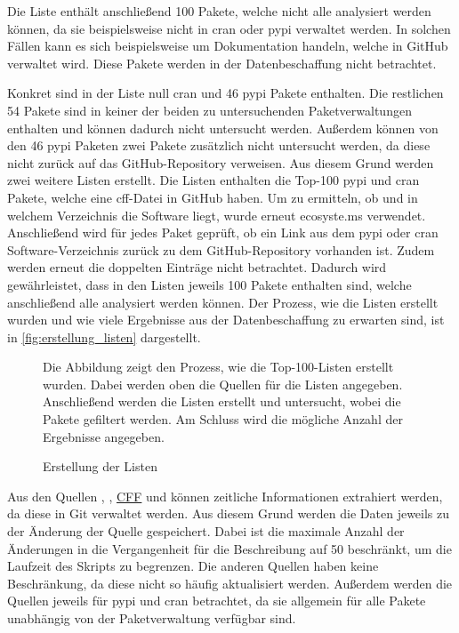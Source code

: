 Die Liste enthält anschließend 100 Pakete, welche nicht alle analysiert werden können, da sie beispielsweise nicht in \gls{cran} oder \gls{pypi} verwaltet werden.
In solchen Fällen kann es sich beispielsweise um Dokumentation handeln, welche in GitHub verwaltet wird.
Diese Pakete werden in der Datenbeschaffung nicht betrachtet.

Konkret sind in der Liste null \gls{cran} und 46 \gls{pypi} Pakete enthalten.
Die restlichen 54 Pakete sind in keiner der beiden zu untersuchenden Paketverwaltungen enthalten und können dadurch nicht untersucht werden.
Außerdem können von den 46 \gls{pypi} Paketen zwei Pakete zusätzlich nicht untersucht werden, da diese nicht zurück auf das GitHub-Repository verweisen.
Aus diesem Grund werden zwei weitere Listen erstellt.
Die Listen enthalten die Top-100 \gls{pypi} und \gls{cran} Pakete, welche eine \gls{cff}-Datei in GitHub haben.
Um zu ermitteln, ob und in welchem Verzeichnis die Software liegt, wurde erneut ecosyste.ms verwendet.
Anschließend wird für jedes Paket geprüft, ob ein Link aus dem \gls{pypi} oder \gls{cran} Software-Verzeichnis zurück zu dem GitHub-Repository vorhanden ist.
Zudem werden erneut die doppelten Einträge nicht betrachtet.
Dadurch wird gewährleistet, dass in den Listen jeweils 100 Pakete enthalten sind, welche anschließend alle analysiert werden können.
Der Prozess, wie die Listen erstellt wurden und wie viele Ergebnisse aus der Datenbeschaffung zu erwarten sind, ist in \autoref{fig:erstellung_listen} dargestellt.

\begin{figure}
    \begin{center}
        
    \end{center}
    \caption{Erstellung der Listen}
    \label{fig:erstellung_listen}
    \small
    Die Abbildung zeigt den Prozess, wie die Top-100-Listen erstellt wurden. Dabei werden oben die Quellen für die Listen angegeben. Anschließend werden die Listen erstellt und untersucht, wobei die Pakete gefiltert werden. Am Schluss wird die mögliche Anzahl der Ergebnisse angegeben.
\end{figure}

Aus den Quellen , , \hyperref[subsec:datenbeschaffung_cff]{CFF} und  können zeitliche Informationen extrahiert werden, da diese in Git verwaltet werden.
Aus diesem Grund werden die Daten jeweils zu der Änderung der Quelle gespeichert.
Dabei ist die maximale Anzahl der Änderungen in die Vergangenheit für die Beschreibung auf 50 beschränkt, um die Laufzeit des Skripts zu begrenzen.
Die anderen Quellen haben keine Beschränkung, da diese nicht so häufig aktualisiert werden.
Außerdem werden die Quellen jeweils für \gls{pypi} und \gls{cran} betrachtet, da sie allgemein für alle Pakete unabhängig von der Paketverwaltung verfügbar sind.

